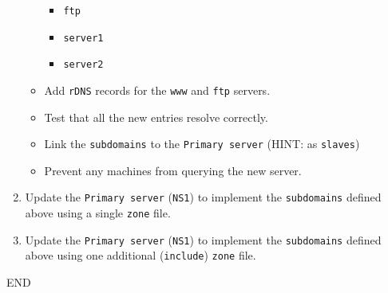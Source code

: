 \documentclass[11pt]{article}
\begin{document}
\begin{enumerate}
\begin{itemize}
\begin{itemize}
                    \item \texttt{ftp}
                    \item \texttt{server1}
                    \item \texttt{server2}
                \end{itemize}
            \item Add \texttt{rDNS} records for the \texttt{www} and \texttt{ftp} servers.
            \item Test that all the new entries resolve correctly.
            \item Link the \texttt{subdomains} to the \texttt{Primary server} (HINT: as \texttt{slaves})
            \item Prevent any machines from querying the new server. 
        \end{itemize}
    \item Update the \texttt{Primary server} (\texttt{NS1}) to implement the \texttt{subdomains} defined above using a single \texttt{zone} file.
    \item Update the \texttt{Primary server} (\texttt{NS1}) to implement the \texttt{subdomains} defined above using one additional (\texttt{include}) \texttt{zone} file.
\end{enumerate}    
END
\end{document}
